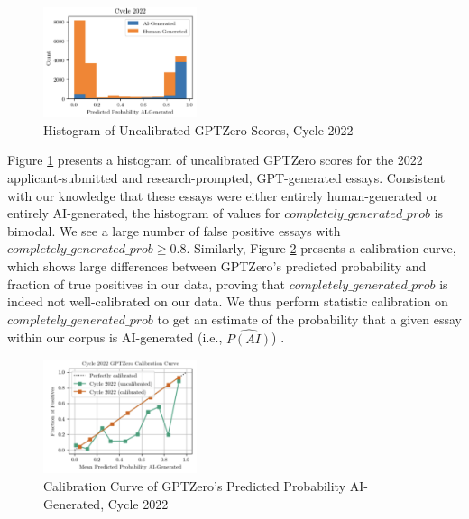 \begin{figure}[tbh]
    \centering
    \includegraphics[width=0.4\textwidth]{figures/generative_ai/hist.png}
    \caption{Histogram of Uncalibrated GPTZero Scores, Cycle 2022}
    \label{fig:c2_hist}
\end{figure}

Figure \ref{fig:c2_hist} presents a histogram of uncalibrated GPTZero scores for the 2022 applicant-submitted and research-prompted, GPT-generated essays. Consistent with our knowledge that these essays were either entirely human-generated or entirely AI-generated, the histogram of values for $completely\_generated\_prob$ is bimodal. We see a large number of false positive essays with $completely\_generated\_prob \geq 0.8$. Similarly, Figure \ref{fig:c2_calibration} presents a calibration curve, which shows large differences between GPTZero's predicted probability and fraction of true positives in our data, proving that $completely\_generated\_prob$ is indeed not well-calibrated on our data. We thus perform statistic calibration on $completely\_generated\_prob$ to get an estimate of the probability that a given essay within our corpus is AI-generated (i.e., $\widehat{P(AI)}$) \cite{niculescu-mizil_predicting_2005}.

\begin{figure}[tbh]
    \centering
    \includegraphics[width=0.4\textwidth]{figures/generative_ai/calibration.png}
    \caption{Calibration Curve of GPTZero's Predicted Probability AI-Generated, Cycle 2022}
    \label{fig:c2_calibration}
\end{figure}

